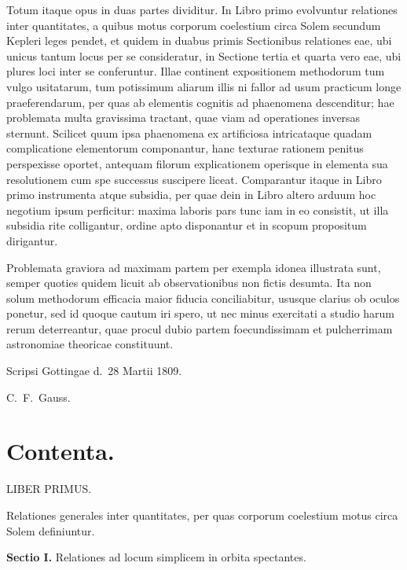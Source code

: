 \documentclass[12pt,a4paper]{book}
\begin{document}
Totum itaque opus in duas partes dividitur. In Libro primo evolvuntur relationes inter quantitates, a quibus motus corporum coelestium circa Solem secundum Kepleri leges pendet, et quidem in duabus primis Sectionibus relationes eae, ubi unicus tantum locus per se consideratur, in Sectione tertia et quarta vero eae, ubi plures loci inter se conferuntur. Illae continent expositionem methodorum tum vulgo usitatarum, tum potissimum aliarum illis ni fallor ad usum practicum longe praeferendarum, per quas ab elementis cognitis ad phaenomena descenditur; hae problemata multa gravissima tractant, quae viam ad operationes inversas sternunt. Scilicet quum ipsa phaenomena ex artificiosa intricataque quadam complicatione elementorum componantur, hanc texturae rationem penitus perspexisse oportet, antequam filorum explicationem operisque in elementa sua resolutionem cum spe successus suscipere liceat. Comparantur itaque in Libro primo instrumenta atque subsidia, per quae dein in Libro altero arduum hoc negotium ipsum perficitur: maxima laboris pars tunc iam in eo consistit, ut illa subsidia rite colligantur, ordine apto disponantur et in scopum propositum dirigantur.

Problemata graviora ad maximam partem per exempla idonea illustrata sunt, semper quoties quidem licuit ab observationibus non fictis desumta. Ita non solum methodorum efficacia maior fiducia conciliabitur, ususque clarius ob oculos ponetur, sed id quoque cautum iri spero, ut nec minus exercitati a studio harum rerum deterreantur, quae procul dubio partem foecundissimam et pulcherrimam astronomiae theoricae constituunt.

Scripsi Gottingae d.~28 Martii 1809.
\medskip
\begin{flushright}
C.~F.\ Gauss.
\end{flushright}

\newpage
\chapter*{Contenta.}

\begin{center}
{\Large LIBER PRIMUS.}
\end{center}
\begin{center}
Relationes generales inter quantitates, per quas corporum coelestium motus circa Solem definiuntur.
\end{center}

\noindent\textbf{Sectio I.} Relationes ad locum simplicem in orbita spectantes.
\end{document}
